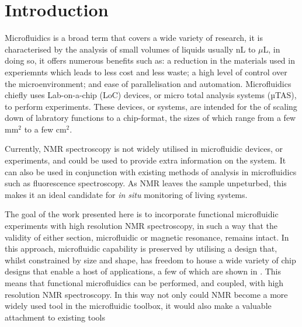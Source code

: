 
\chapter{Introduction}

Microfluidics is a broad term that covers a wide variety of research, it is characterised by
the analysis of small volumes of liquids usually nL to $\mu$L, in doing so, it offers numerous benefits
such as: a reduction in the materials used in experiemnts which leads to less cost and less waste; a high
level of control over the microenvironment; and ease of parallelisation and automation.
Microfluidics chiefly uses Lab-on-a-chip (LoC) devices, or micro total analysis
systems (µTAS), to perform experiments. These devices, or systems, are intended for the of scaling down of
labratory functions to a chip-format, the sizes of which range from a few mm$^2$ to a few cm$^2$.

Currently, NMR spectroscopy is not widely utilised in microfluidic devices, or experiments, and could be
used to provide extra information on the system. It can also be used in conjunction with existing methods
of analysis in microfluidics such as fluorescence spectroscopy.
As NMR leaves the sample unpeturbed, this makes it an ideal candidate for \textit{in situ} monitoring of
living systems.

The goal of the work presented here is to incorporate functional microfluidic experiments with high
resolution NMR spectroscopy, in such a way that the validity of either section, microfluidic or magnetic
resonance, remains intact. In this approach, microfluidic capability is preserved by utilising a design
that, whilst constrained by size and shape, has freedom to house a wide variety of chip designs that enable
a host of applications, a few of which are shown in . This means that functional
microfluidics can be performed, and coupled, with high resolution NMR spectroscopy. In this way not only
could NMR become a more widely used tool in the microfluidic toolbox, it would also make a valuable
attachment to existing tools

